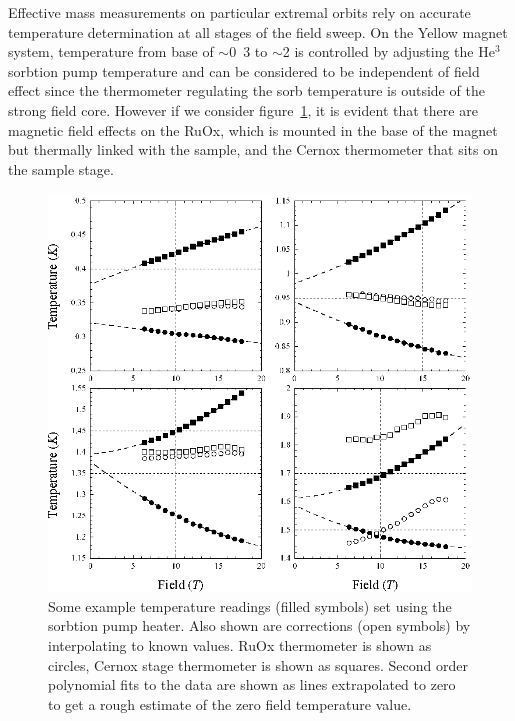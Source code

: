 Effective mass measurements on particular extremal orbits rely on accurate temperature determination at all stages of the field sweep. On the Yellow magnet system, temperature from base of $\sim$\unit{0.3}{\kelvin} to $\sim$\unit{2}{\kelvin} is controlled by adjusting the He$^3$ sorbtion pump temperature and can be considered to be independent of field effect since the thermometer regulating the sorb temperature is outside of the strong field core. However if we consider figure~\ref{Fig:Exp:TemperatureCorrection}, it is evident that there are magnetic field effects on the RuOx, which is mounted in the base of the magnet but thermally linked with the sample, and the Cernox thermometer that sits on the sample stage.
\begin{figure}[htbp]
    \begin{center}
        \includegraphics[scale=0.9]{Chapter-ExperimentalTechnique/Figures/TemperatureCorrection/TemperatureCorrection}
        \caption{Some example temperature readings (filled symbols) set using the sorbtion pump heater. Also shown are corrections (open symbols) by interpolating to known values. RuOx thermometer is shown as circles, Cernox stage thermometer is shown as squares. Second order polynomial fits to the data are shown as lines extrapolated to zero to get a rough estimate of the zero field temperature value.}
        \label{Fig:Exp:TemperatureCorrection}
    \end{center}
\end{figure}
